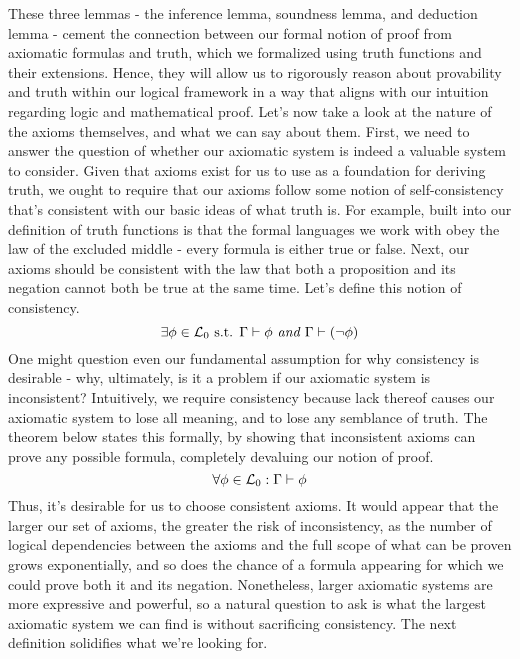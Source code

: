 \documentclass{article}
\begin{document}
\nn
These three lemmas - the inference lemma, soundness lemma, and deduction lemma - cement the connection between our formal notion of proof from axiomatic formulas and truth, which we formalized using truth functions and their extensions. Hence, they will allow us to rigorously reason about provability and truth within our logical framework in a way that aligns with our intuition regarding logic and mathematical proof. Let's now take a look at the nature of the axioms themselves, and what we can say about them. First, we need to answer the question of whether our axiomatic system is indeed a valuable system to consider. Given that axioms exist for us to use as a foundation for deriving truth, we ought to require that our axioms follow some notion of self-consistency that's consistent with our basic ideas of what truth is. For example, built into our definition of truth functions is that the formal languages we work with obey the law of the excluded middle - every formula is either true or false. Next, our axioms should be consistent with the law that both a proposition and its negation cannot both be true at the same time. Let's define this notion of consistency.
    $$ \exists \phi \in \mathcal{L}_0 \textnormal{ s.t. } \Gamma \vdash \phi \textit{ and } \Gamma \vdash (\neg \phi) $$
One might question even our fundamental assumption for why consistency is desirable - why, ultimately, is it a problem if our axiomatic system is inconsistent? Intuitively, we require consistency because lack thereof causes our axiomatic system to lose all meaning, and to lose any semblance of truth. The theorem below states this formally, by showing that inconsistent axioms can prove any possible formula, completely devaluing our notion of proof.
    $$ \forall \phi \in \mathcal{L}_0: \Gamma \vdash \phi $$
Thus, it's desirable for us to choose consistent axioms. It would appear that the larger our set of axioms, the greater the risk of inconsistency, as the number of logical dependencies between the axioms and the full scope of what can be proven grows exponentially, and so does the chance of a formula appearing for which we could prove both it and its negation. Nonetheless, larger axiomatic systems are more expressive and powerful, so a natural question to ask is what the largest axiomatic system we can find is without sacrificing consistency. The next definition solidifies what we're looking for.
\end{document}
